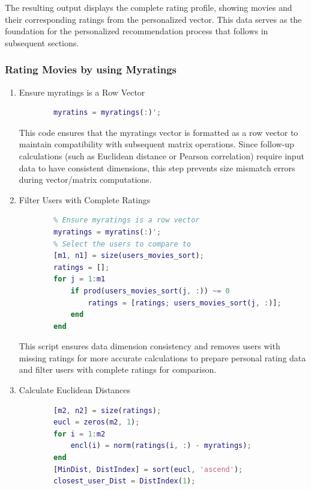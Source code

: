 The resulting output displays the complete rating profile, showing movies and their corresponding ratings from the personalized vector. This data serves as the foundation for the personalized recommendation process that follows in subsequent sections.

\subsubsection{Rating Movies by using Myratings}

\begin{enumerate}[label=\alph*.]
	\item Ensure myratings is a Row Vector
	
	\begin{lstlisting}[style=StyleCode, language=MATLAB]
		% Ensure myratins is a row vector
		myratins = myratings(:)';
	\end{lstlisting}
	
	This code ensures that the myratings vector is formatted as a row vector to maintain compatibility with subsequent matrix operations. Since follow-up calculations (such as Euclidean distance or Pearson correlation) require input data to have consistent dimensions, this step prevents size mismatch errors during vector/matrix computations.
	
	\item Filter Users with Complete Ratings
	
	\begin{lstlisting}[style=StyleCode, language=MATLAB]
		% Personal Recommendations using myratins
		% Ensure myratings is a row vector
		myratings = myratins(:)';
		% Select the users to compare to 
		[m1, n1] = size(users_movies_sort);
		ratings = [];
		for j = 1:m1
			if prod(users_movies_sort(j, :)) ~= 0
				ratings = [ratings; users_movies_sort(j, :)];
			end
		end
	\end{lstlisting}
	
	This script ensures data dimension consistency and removes users with missing ratings for more accurate calculations to prepare personal rating data and filter users with complete ratings for comparison.
	
	\item Calculate Euclidean Distances
	
	\begin{lstlisting}[style=StyleCode, language=MATLAB]
		% Find the Euclidean distance
		[m2, n2] = size(ratings);
		eucl = zeros(m2, 1);
		for i = 1:m2
			encl(i) = norm(ratings(i, :) - myratings);
		end
		[MinDist, DistIndex] = sort(eucl, 'ascend');
		closest_user_Dist = DistIndex(1);
	\end{lstlisting}
	

\end{enumerate}
